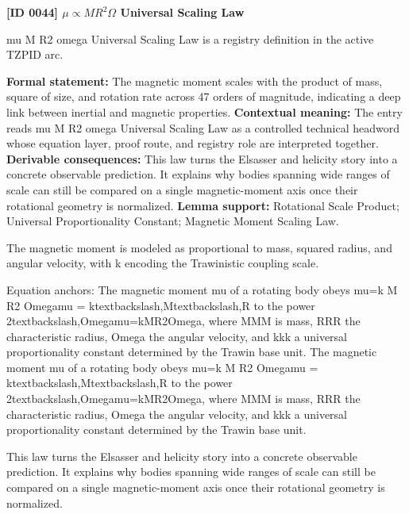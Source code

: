 \clearpage
\noindent\textbf{[ID 0044] \texorpdfstring{\(\mu \propto M R^{2}\Omega\)}{mu proportional to MR^2 Omega} Universal Scaling Law}\par
\vspace{0.35em}
\begingroup\small
{}
mu   M R2 omega Universal Scaling Law is a registry definition in the active TZPID arc.

\begingroup\footnotesize\setlength{\emergencystretch}{3em}\sloppy
\textbf{Formal statement:} The magnetic moment scales with the product of mass, square of size, and rotation rate across 47 orders of magnitude, indicating a deep link between inertial and magnetic properties. \textbf{Contextual meaning:} The entry reads mu   M R2 omega Universal Scaling Law as a controlled technical headword whose equation layer, proof route, and registry role are interpreted together. \textbf{Derivable consequences:} This law turns the Elsasser and helicity story into a concrete observable prediction. It explains why bodies spanning wide ranges of scale can still be compared on a single magnetic-moment axis once their rotational geometry is normalized. \textbf{Lemma support:} Rotational Scale Product; Universal Proportionality Constant; Magnetic Moment Scaling Law.\par
\endgroup

The magnetic moment is modeled as proportional to mass, squared radius, and angular velocity, with k encoding the Trawinistic coupling scale.

Equation anchors: The magnetic moment mu of a rotating body obeys mu=k M R2 Omegamu = ktextbackslash,Mtextbackslash,R to the power 2textbackslash,Omegamu=kMR2Omega, where MMM is mass, RRR the characteristic radius, Omega the angular velocity, and kkk a universal proportionality constant determined by the Trawin base unit. The magnetic moment mu of a rotating body obeys mu=k M R2 Omegamu = ktextbackslash,Mtextbackslash,R to the power 2textbackslash,Omegamu=kMR2Omega, where MMM is mass, RRR the characteristic radius, Omega the angular velocity, and kkk a universal proportionality constant determined by the Trawin base unit.

This law turns the Elsasser and helicity story into a concrete observable prediction. It explains why bodies spanning wide ranges of scale can still be compared on a single magnetic-moment axis once their rotational geometry is normalized.
\endgroup


